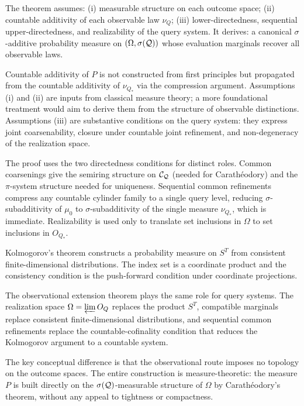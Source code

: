 \begin{remark}
The theorem assumes: (i) measurable structure on each outcome space;
(ii) countable additivity of each observable law $\nu_Q$; (iii)
lower-directedness, sequential upper-directedness, and realizability
of the query system. It derives: a canonical $\sigma$-additive
probability measure on $(\Omega,\sigma(\mathcal{Q}))$ whose evaluation
marginals recover all observable laws.

Countable additivity of $P$ is not constructed from first principles
but propagated from the countable additivity of $\nu_{Q_*}$ via the
compression argument. Assumptions (i) and (ii) are inputs from
classical measure theory; a more foundational treatment would aim to
derive them from the structure of observable distinctions. Assumptions
(iii) are substantive conditions on the query system: they express
joint coarsenability, closure under countable joint refinement, and
non-degeneracy of the realization space.
\end{remark}

\begin{remark}
The proof uses the two directedness conditions for distinct roles.
Common coarsenings give the semiring structure on $\mathcal{C}_{\mathcal{Q}}$
(needed for Carathéodory) and the $\pi$-system structure needed for
uniqueness.  Sequential common refinements compress any countable
cylinder family to a single query level, reducing $\sigma$-subadditivity
of $\mu_0$ to $\sigma$-subadditivity of the single measure $\nu_{Q_*}$,
which is immediate.  Realizability is used only to translate set
inclusions in $\Omega$ to set inclusions in $O_{Q_*}$.
\end{remark}

\begin{remark}
Kolmogorov's theorem constructs a probability measure on $S^T$ from
consistent finite-dimensional distributions.  The index set is a
coordinate product and the consistency condition is the push-forward
condition under coordinate projections.

The observational extension theorem plays the same role for query
systems.  The realization space $\Omega=\varprojlim O_Q$ replaces the
product $S^T$, compatible marginals replace consistent
finite-dimensional distributions, and sequential common refinements
replace the countable-cofinality condition that reduces the Kolmogorov
argument to a countable system.

The key conceptual difference is that the observational route imposes
no topology on the outcome spaces.  The entire construction is
measure-theoretic: the measure $P$ is built directly on the
$\sigma(\mathcal{Q})$-measurable structure of $\Omega$ by Carathéodory's
theorem, without any appeal to tightness or compactness.
\end{remark}

